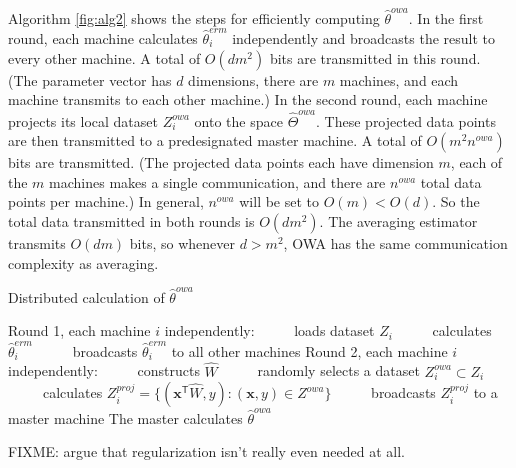 \documentclass[twoside]{article}
\newcommand{\Zproj}{Z^{\textit{proj}}}
\newcommand{\Zowa}{Z^{\textit{owa}}}
\newcommand{\nowa}{n^{\textit{owa}}}
\newcommand{\matW}{\hat W}
\newcommand{\W}{{\hat \Theta^{\textit{owa}}}}
\newcommand{\x}{\mathbf{x}}
\newcommand{\w}{\theta}
\newcommand{\wowa}{\hat\w^{owa}}
\newcommand{\wmle}{\hat\w^{erm}}
\newcommand{\trans}[1]{\ensuremath{{#1}^{\mathsf{T}}}}
\begin{document}
Algorithm \ref{fig:alg2} shows the steps for efficiently computing $\wowa$.
In the first round, each machine calculates $\wmle_i$ independently and broadcasts the result to every other machine.
A total of $O(dm^2)$ bits are transmitted in this round.
(The parameter vector has $d$ dimensions,
there are $m$ machines,
and each machine transmits to each other machine.)
In the second round, each machine projects its local dataset $\Zowa_i$ onto the space $\W$.
These projected data points are then transmitted to a predesignated master machine.
A total of $O(m^2\nowa)$ bits are transmitted.
(The projected data points each have dimension $m$, 
each of the $m$ machines makes a single communication,
and there are $\nowa$ total data points per machine.)
In general, $\nowa$ will be set to $O(m)<O(d)$.
So the total data transmitted in both rounds is $O(dm^2)$. 
The averaging estimator transmits $O(dm)$ bits,
so whenever $d>m^2$, OWA has the same communication complexity as averaging.

\begin{algorithm}[t]
\caption{Distributed calculation of $\wowa$}
\label{alg:distributed}
\begin{algorithmic}
\STATE Round 1, each machine $i$ independently:
\STATE ~~~~~loads dataset $Z_i$
\STATE ~~~~~calculates $\wmle_i$
\STATE ~~~~~broadcasts $\wmle_i$ to all other machines
\STATE Round 2, each machine $i$ independently:
\STATE ~~~~~constructs $\matW$
\STATE ~~~~~randomly selects a dataset $\Zowa_i\subset Z_i$
\STATE ~~~~~calculates $\Zproj_i=\{(\trans\x\matW,y) : (\x,y)\in\Zowa\}$
\STATE ~~~~~broadcasts $\Zproj_i$ to a master machine
\STATE The master calculates $\wowa$
\end{algorithmic}
\label{fig:alg2}
\end{algorithm}

FIXME: argue that regularization isn't really even needed at all.
\end{document}
